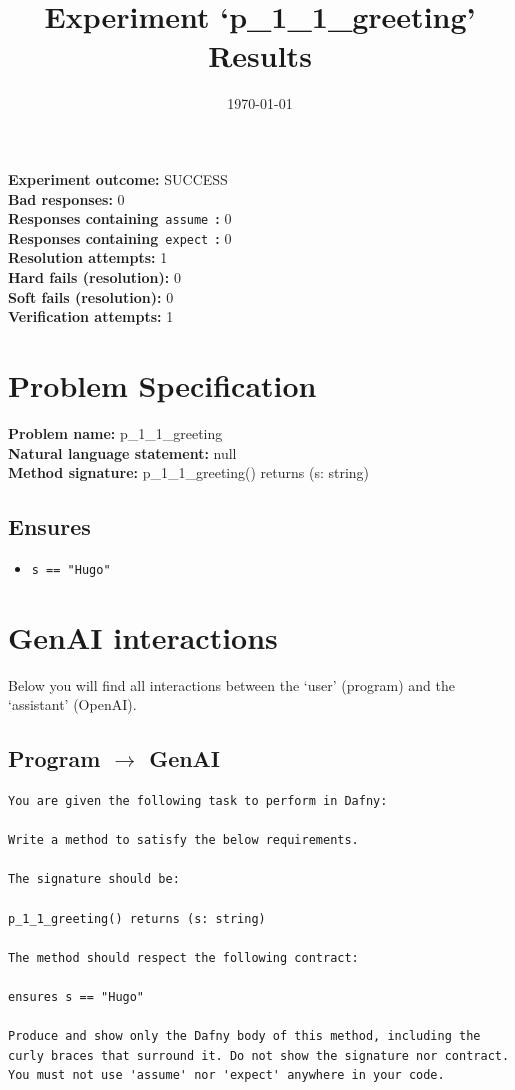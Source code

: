 \documentclass{article}
\begin{document}
\title{Experiment `p\_1\_1\_greeting' Results}
\author{\today}
\date{}
\maketitle
\textbf{Experiment outcome: }SUCCESS
\\\textbf{Bad responses: }0
\\\textbf{Responses containing}~\texttt{assume}~\textbf{: }0
\\\textbf{Responses containing}~\texttt{expect}~\textbf{: }0
\\\textbf{Resolution attempts: }1
\\\textbf{Hard fails (resolution): }0
\\\textbf{Soft fails (resolution): }0
\\\textbf{Verification attempts: }1
\section*{Problem Specification}
\textbf{Problem name: }p\_1\_1\_greeting
\\\textbf{Natural language statement: }null
\\\textbf{Method signature: }p\_1\_1\_greeting() returns (s: string)
\subsection*{Ensures}
\begin{itemize}
\item \texttt{s == "Hugo"}
\end{itemize}
\clearpage
\section*{GenAI interactions}
Below you will find all interactions between the `user' (program) and the `assistant' (OpenAI).
\subsection*{Program $\rightarrow$ GenAI}
\begin{lstlisting}
You are given the following task to perform in Dafny:

Write a method to satisfy the below requirements.

The signature should be:

p_1_1_greeting() returns (s: string)

The method should respect the following contract:

ensures s == "Hugo"

Produce and show only the Dafny body of this method, including the curly braces that surround it. Do not show the signature nor contract. You must not use 'assume' nor 'expect' anywhere in your code.
\end{lstlisting}
\end{document}
